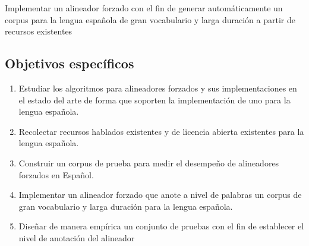 Implementar un alineador forzado con el fin de generar automáticamente un corpus para la lengua española de gran vocabulario y larga duración a partir de recursos existentes

\subsection{Objetivos específicos}

\begin{enumerate}
    \item Estudiar los algoritmos para alineadores forzados y sus implementaciones en el estado del arte de forma que soporten la implementación de uno para la lengua española.
    \item Recolectar recursos hablados existentes y de licencia abierta existentes para la lengua española.
    \item Construir un corpus de prueba para medir el desempeño de alineadores forzados en Español.
    \item Implementar un alineador forzado que anote a nivel de palabras un corpus de gran vocabulario y larga duración para la lengua española.
    \item Diseñar de manera empírica un conjunto de pruebas con el fin de establecer el nivel de anotación del alineador

\end{enumerate}





